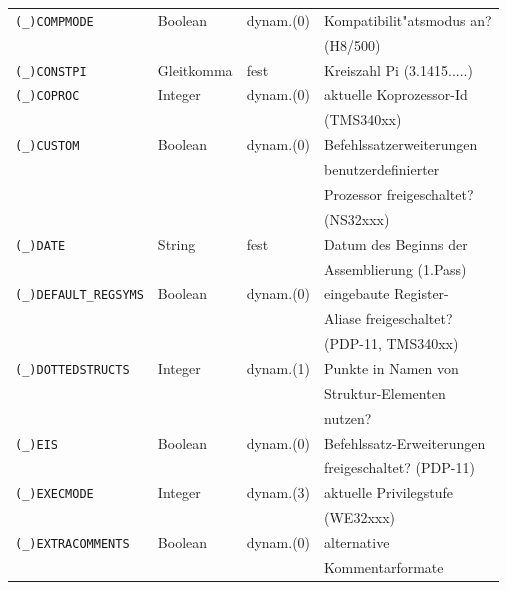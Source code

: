 \documentclass[12pt,a4paper,twoside]{report}
\newcommand{\predefsym}[1]{{\tt (\_)#1}}
\begin{document}
\begin{center}
\begin{longtable}{|l|l|l|l|}
\hline
\predefsym{COMPMODE}   &  Boolean    & dynam.(0)  & Kompatibilit"atsmodus an? \\
                       &             &            & (H8/500) \\
\hline
\predefsym{CONSTPI}    &  Gleitkomma & fest       & Kreiszahl Pi (3.1415.....) \\
\hline
\predefsym{COPROC}     &  Integer    & dynam.(0)  & aktuelle Koprozessor-Id \\
                       &             &            & (TMS340xx) \\
\hline
\predefsym{CUSTOM}     &  Boolean    & dynam.(0)  & Befehlssatzerweiterungen \\
                       &             &            & benutzerdefinierter \\
                       &             &            & Prozessor freigeschaltet? \\
                       &             &            & (NS32xxx) \\
\hline
\predefsym{DATE}       &  String     & fest       & Datum des Beginns der  \\
                       &             &            & Assemblierung (1.Pass) \\
\hline
\predefsym{DEFAULT\_REGSYMS} & Boolean & dynam.(0) & eingebaute Register- \\
                       &             &            & Aliase freigeschaltet? \\
                       &             &            & (PDP-11, TMS340xx) \\
\hline
\predefsym{DOTTEDSTRUCTS} &  Integer & dynam.(1)  & Punkte in Namen von \\
                       &             &            & Struktur-Elementen \\
                       &             &            & nutzen? \\
\hline
\predefsym{EIS}        & Boolean     & dynam.(0)  & Befehlssatz-Erweiterungen \\
                       &             &            & freigeschaltet? (PDP-11) \\
\hline
\predefsym{EXECMODE}   &  Integer    & dynam.(3)  & aktuelle Privilegstufe \\
                       &             &            & (WE32xxx) \\
\hline
\predefsym{EXTRACOMMENTS} & Boolean  & dynam.(0)  & alternative \\
                       &             &            & Kommentarformate \\

\end{longtable}
\end{center}
\end{document}
